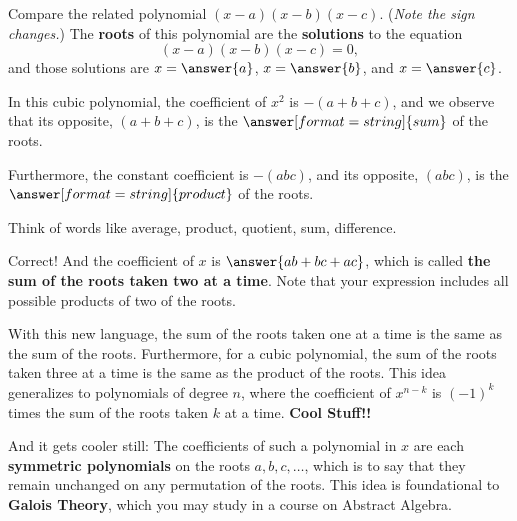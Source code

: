 \documentclass{ximera}
\begin{document}
\begin{problem}
Compare the related polynomial $(x-a)(x-b)(x-c)$.  (\emph{Note the sign changes.}) The \textbf{roots} of this polynomial are the \textbf{solutions} to the 
equation 
\[
(x-a)(x-b)(x-c)=0, 
\]
and those solutions are $x=\answer{a}$, $x=\answer{b}$, and $x=\answer{c}$.  

\begin{problem}
In this cubic polynomial, the coefficient of $x^2$ is $-(a+b+c)$, and we observe that its opposite, $(a+b+c)$, is the $\answer[format=string]{sum}$ of the roots.  

Furthermore, the constant coefficient is $-(abc)$, and its opposite, $(abc)$, is the $\answer[format=string]{product}$ of the roots.  
\begin{hint}
Think of words like average, product, quotient, sum, difference. 
\end{hint}

\begin{problem}
Correct!  And the coefficient of $x$ is $\answer{ab+bc+ac}$, which is called \textbf{the sum of the roots taken two at a time}.  Note that your expression includes all possible products of two of the roots.  
\newline

With this new language, the sum of the roots taken one at a time is the same as the sum of the roots.  Furthermore, for a cubic polynomial, the sum of the roots taken three at a time is the same as the product of the roots.  This idea generalizes to polynomials of degree $n$, where the coefficient of $x^{n-k}$ is $(-1)^k$ times the sum of the roots taken $k$ at a time.  \textbf{Cool Stuff!!}

And it gets cooler still:  The coefficients of such a polynomial in $x$ are each \textbf{symmetric polynomials} on the roots $a, b, c, \dots$, which is to say that they remain unchanged on any permutation of the roots.  This idea is foundational to \textbf{Galois Theory}, which you may study in a course on Abstract Algebra.  
\end{problem}
\end{problem}
\end{problem}



\end{document}
